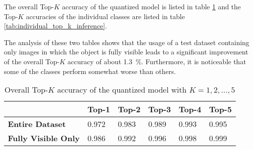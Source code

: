 The overall Top-$K$ accuracy of the quantized model is listed in table \ref{tab:overall_top_k_inference} and the Top-$K$ accuracies of the individual classes are listed in table \ref{tab:individual_top_k_inference}.

The analysis of these two tables shows that the usage of a test dataset containing only images in which the object is fully visible leads to a significant improvement of the overall Top-$K$ accuracy of about \SI{1.3}{\percent}.
Furthermore, it is noticeable that some of the classes perform somewhat worse than others.

\begin{table}
  \caption{Overall Top-$K$ accuracy of the quantized model with $K = 1, 2, \dots, 5$}
  \label{tab:overall_top_k_inference}
  \centering
  \begin{tabular}{llllll}
    \toprule
     & \textbf{Top-1} & \textbf{Top-2} & \textbf{Top-3} & \textbf{Top-4} & \textbf{Top-5} \\
    \midrule
    \textbf{Entire Dataset} & \num{0.972} & \num{0.983} & \num{0.989} & \num{0.993} & \num{0.995} \\
    \textbf{Fully Visible Only} & \num{0.986} & \num{0.992} & \num{0.996} & \num{0.998} & \num{0.999} \\ %
    \bottomrule
  \end{tabular}
\end{table}

